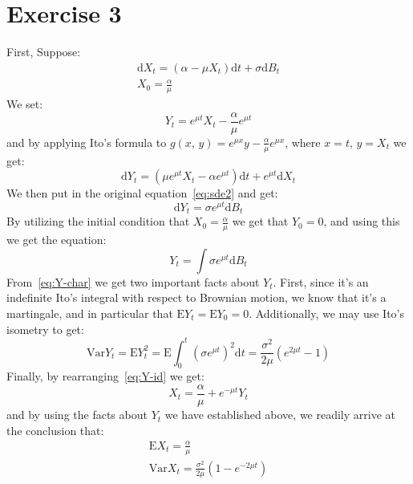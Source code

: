 \documentclass{amsart}
\theoremstyle{plain}
\theoremstyle{definition}
\theoremstyle{definition}
\theoremstyle{remark}
\newcommand{\diff}{\mathrm{d}}
\begin{document}
        \section{Exercise 3}
        First, Suppose:
        \begin{gather}
            \label{eq:sde2}
            \diff  X_{t} = \left(\alpha-\mu X_{t}\right)\diff t + \sigma \diff B_{t} \\
            X_{0} = \frac{\alpha}{\mu}
        \end{gather}
        We set:
        \begin{equation}
            \label{eq:Y-id}
            Y_{t} = e^{\mu t}X_{t} - \frac{\alpha}{\mu}e^{\mu t}
        \end{equation}
        and by applying Ito's formula to \(g \left(x,\,y\right) = e^{\mu x}y - \frac{\alpha}{\mu}e^{\mu x}\), where \(x=t,\,y=X_{t}\) we get:
        \begin{equation*}
            \diff Y_{t} = \left(\mu e^{\mu t}X_{t}-\alpha e^{\mu t}\right) \diff t + e^{\mu t}\diff X_{t}
        \end{equation*}
        We then put in the original equation~\eqref{eq:sde2} and get:
        \begin{equation*}
            \diff Y_{t} = \sigma e^{\mu t}\diff B_{t}
        \end{equation*}
        By utilizing the initial condition that \(X_{0} = \frac{\alpha}{\mu}\) we get that \(Y_{0} = 0\), and using this we get the equation:
        \begin{equation}
            \label{eq:Y-char}
            Y_{t} = \int \sigma e^{\mu t}\diff B_{t}
        \end{equation}
        From~\eqref{eq:Y-char} we get two important facts about \(Y_{t}\). First, since it's an indefinite Ito's integral with respect to Brownian motion, we know that it's a martingale, and in particular that \(\mathrm{E}Y_{t}=\mathrm{E}Y_{0}=0\). Additionally, we may use Ito's isometry to get:
        \begin{equation*}
            \mathrm{Var}Y_{t} = \mathrm{E}Y_{t}^{2} = \mathrm{E}\int_{0}^{t} \left(\sigma e^{\mu t}\right)^{2} \diff t = \frac{\sigma^{2}}{2 \mu} \left(e^{2 \mu t} - 1\right)
        \end{equation*}
       Finally, by rearranging~\eqref{eq:Y-id} we get:
       \begin{equation*}
           X_{t} = \frac{\alpha}{\mu} + e^{-\mu t}Y_{t}
       \end{equation*}
       and by using the facts about \(Y_{t}\) we have established above, we readily arrive at the conclusion that:
       \begin{gather*}
           \mathrm{E}X_{t} = \frac{\alpha}{\mu} \\
           \mathrm{Var} X_{t} = \frac{\sigma^{2}}{2 \mu} \left(1 - e^{-2 \mu t}\right)
       \end{gather*}
       
\end{document}
